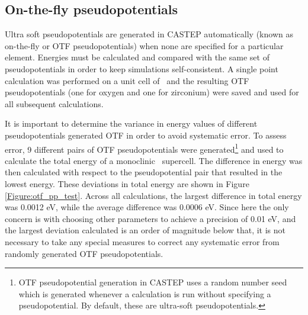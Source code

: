\subsection{On-the-fly pseudopotentials}

Ultra soft pseudopotentials are generated in CASTEP automatically (known as on-the-fly or OTF pseudopotentials) when none are specified for a particular element. Energies must be calculated and compared with the same set of pseudopotentials in order to keep simulations self-consistent. A single point calculation was performed on a unit cell of \zirconia\ and the resulting OTF pseudopotentials (one for oxygen and one for zirconium) were saved and used for all subsequent calculations. 

It is important to determine the variance in energy values of different pseudopotentials generated OTF in order to avoid systematic error. To assess error, 9 different pairs of OTF pseudopotentials were generated\footnote{OTF pseudopotential generation in CASTEP uses a random number seed which is generated whenever a calculation is run without specifying a pseudopotential. By default, these are ultra-soft pseudopotentials.} and used to calculate the total energy of a monoclinic \zirconia\ supercell. The difference in energy was then calculated with respect to the pseudopotential pair that resulted in the lowest energy. These deviations in total energy are shown in Figure \ref{Figure:otf_pp_test}. Across all calculations, the largest difference in total energy was 0.0012 eV, while the average difference was 0.0006 eV. Since here the only concern is with choosing other parameters to achieve a precision of 0.01 eV, and the largest deviation calculated is an order of magnitude below that, it is not necessary to take any special measures to correct any systematic error from randomly generated OTF pseudopotentials.


